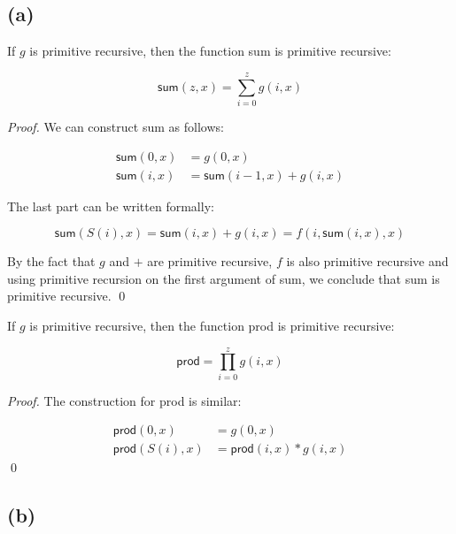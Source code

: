 \documentclass[11pt]{llncs}
\begin{document}
\subsection*{(a)}
\begin{lemma}
If $g$ is primitive recursive, then the function \textsf{sum} is primitive
recursive:

\[
\textsf{sum}(z, x) = \sum_{i = 0}^z g(i, x)
\]
\end{lemma}
\begin{proof}
We can construct \textsf{sum} as follows:

\begin{align*}
  \textsf{sum}(0, x) &= g(0, x)\\
  \textsf{sum}(i, x) &= \textsf{sum}(i - 1, x) + g(i, x)
\end{align*}

The last part can be written formally:

\[
  \textsf{sum}(S(i), x)
  = \textsf{sum}(i, x) + g(i, x) = f(i, \textsf{sum}(i, x), x)
\]

By the fact that $g$ and $+$ are primitive recursive, $f$ is also primitive
recursive and using primitive recursion on the first argument of \textsf{sum},
we conclude that \textsf{sum} is primitive recursive.
\qed
\end{proof}
\begin{lemma}
If $g$ is primitive recursive, then the function \textsf{prod} is primitive
recursive:

\[
  \textsf{prod} = \prod_{i=0}^z g(i, x)
\]
\end{lemma}
\begin{proof}
The construction for \textsf{prod} is similar:

\begin{align*}
  \textsf{prod}(0, x) &= g(0, x)\\
  \textsf{prod}(S(i), x) &= \textsf{prod}(i, x) * g(i, x)
\end{align*}
\qed
\end{proof}

\subsection*{(b)}
\end{document}
